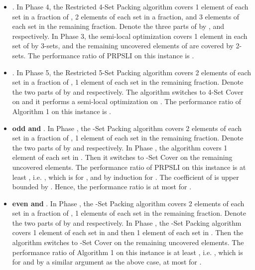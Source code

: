\documentclass[runningheads,a4paper]{llncs}
\numberwithin{equation}{section}
\begin{document}
\begin{itemize}

    \item \textbf{}. In Phase 4, the Restricted 4-Set Packing algorithm covers 1 element of each set in a  fraction of , 2 elements of each set in a  fraction, and 3 elements of each set in the remaining  fraction. Denote the three parts of  by ,  and  respectively. In Phase 3, the semi-local optimization covers 1 element in each set of  by 3-sets, and the remaining uncovered elements of  are covered by 2-sets. The performance ratio of PRPSLI on this instance is . \\

    \item \textbf{}. In Phase 5, the Restricted 5-Set Packing algorithm covers 2 elements of each set in a  fraction of , 1 element of each set in the remaining  fraction. Denote the two parts of  by  and  respectively. The algorithm switches to 4-Set Cover on  and it performs a semi-local optimization on . The performance ratio of Algorithm 1 on this instance is . \\

    \item \textbf{ odd and }. In Phase , the -Set Packing algorithm covers 2 elements of each set in a  fraction of , 1 element of each set in the remaining  fraction. Denote the two parts of  by  and  respectively. In Phase , the algorithm covers 1 element of each set in . Then it switches to -Set Cover on the remaining uncovered elements. The performance ratio of PRPSLI on this instance is at least , i.e. , which is  for , and by induction   for . The coefficient of  is upper bounded by . Hence, the performance ratio is at most  for . \\

    \item \textbf{ even and }. In Phase , the -Set Packing algorithm covers 2 elements of each set in a  fraction of , 1 elements of each set in the remaining  fraction. Denote the two parts of  by  and  respectively. In Phase , the -Set Packing algorithm covers 1 element of each set in  and then 1 element of each set in . Then the algorithm switches to -Set Cover on the remaining uncovered elements. The performance ratio of Algorithm 1 on this instance is at least , i.e. , which is  for  and by a similar argument as the above case, at most  for . \\

\end{itemize}
\end{document}
